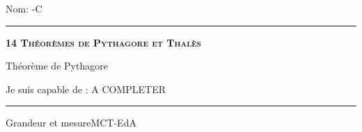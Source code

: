 \documentclass[11pt,a4paper]{article}
\begin{document}
\begin{titlepage}
    \setlength{\topskip}{0mm}
Nom: \hfill \the\year-C
\vspace{0.5cm}
\hrule

    \centering
    \vspace{0.1\textheight}
	{\bfseries\scshape\Huge 14 Théorèmes de Pythagore et Thalès\par}
    \vspace{1.5cm}

    {\huge Théorème de Pythagore}
	\vspace{1.5cm}
    
    {\large Je suis capable de :}
    \vspace{1.5cm}
    A COMPLETER

\vfill
\hrule
\vspace{0.5cm}
Grandeur et mesure\hfill MCT-EdA

\end{titlepage}
\end{document}
